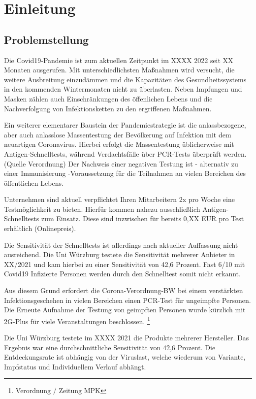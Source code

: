 \chapter{Einleitung}
\section{Problemstellung}
Die Covid19-Pandemie ist zum aktuellen Zeitpunkt im XXXX 2022 seit XX Monaten ausgerufen. Mit unterschiedlichsten Maßnahmen wird versucht, die weitere Ausbreitung einzudämmen und die Kapazitäten des Gesundheitssystems in den kommenden Wintermonaten nicht zu überlasten. Neben Impfungen und Masken zählen auch Einschränkungen des öffenlichen Lebens und die Nachverfolgung von Infektionsketten zu den ergriffenen Maßnahmen.

Ein weiterer elementarer Baustein der Pandemiestrategie ist die anlassbezogene, aber auch anlasslose Massentestung der Bevölkerung auf Infektion mit dem neuartigen Coronavirus. Hierbei erfolgt die Massentestung üblicherweise mit Antigen-Schnelltests, während Verdachtsfälle über PCR-Tests überprüft werden. (Quelle Verordnung) Der Nachweis einer negativen Testung ist - alternativ zu einer Immunisierung -Voraussetzung für die Teilnahmen an vielen Bereichen des öffentlichen Lebens.

Unternehmen sind aktuell verpflichtet Ihren Mitarbeitern 2x pro Woche eine Testmöglichkeit zu bieten. Hierfür kommen nahezu ausschließlich Antigen-Schnelltests zum Einsatz. Diese sind inzwischen für bereits 0,XX EUR pro Test erhältlich (Onlinepreis).

Die Sensitivität der Schnelltests ist allerdings nach aktueller Auffassung nicht ausreichend. Die Uni Würzburg testete die Sensitivität mehrerer Anbieter in XX/2021 und kam hierbei zu einer Sensitivität von 42,6 Prozent. Fast 6/10 mit Covid19 Infizierte Personen werden durch den Schnelltest somit nicht erkannt.

Aus diesem Grund erfordert die Corona-Verordnung-BW bei einem verstärkten Infektionsgeschehen in vielen Bereichen einen PCR-Test für ungeimpfte Personen. Die Erneute Aufnahme der Testung von geimpften Personen wurde kürzlich mit 2G-Plus für viele Veranstaltungen beschlossen.
\footnote{Verordnung / Zeitung MPK}

Die Uni Würzburg testete im XXXX 2021 die Produkte mehrerer Hersteller.
Das Ergebnis war eine durchschnittliche Sensitivität von 42,6 Prozent.
Die Entdeckungsrate ist abhängig von der Viruslast, welche wiederum von Variante, Impfstatus und Individuellem Verlauf abhängt.


